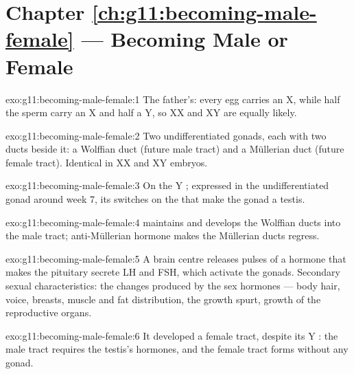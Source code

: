 \section*{Chapter \ref{ch:g11:becoming-male-female} --- Becoming Male or Female}

\begin{solution}{exo:g11:becoming-male-female:1}
The father's: every egg carries an X, while half the sperm carry an X
and half a Y, so XX and XY are equally likely.
\end{solution}

\begin{solution}{exo:g11:becoming-male-female:2}
Two undifferentiated gonads, each with two ducts beside it: a
Wolffian duct (future male tract) and a Müllerian duct (future female
tract). Identical in XX and XY embryos.
\end{solution}

\begin{solution}{exo:g11:becoming-male-female:3}
On the Y ; expressed in the undifferentiated gonad around
week 7, its  switches on the  that make the gonad a
testis.
\end{solution}

\begin{solution}{exo:g11:becoming-male-female:4}
 maintains and develops the Wolffian ducts into the male
tract; anti-Müllerian hormone makes the Müllerian ducts regress.
\end{solution}

\begin{solution}{exo:g11:becoming-male-female:5}
A brain centre releases pulses of a hormone that makes the pituitary
secrete LH and FSH, which activate the gonads. Secondary sexual
characteristics: the changes produced by the sex hormones --- body
hair, voice, breasts, muscle and fat distribution, the growth spurt,
growth of the reproductive organs.
\end{solution}

\begin{solution}{exo:g11:becoming-male-female:6}
It developed a female tract, despite its Y : the male tract
requires the testis's hormones, and the female tract forms without any
gonad.
\end{solution}

